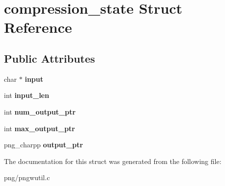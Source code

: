 \hypertarget{structcompression__state}{}\section{compression\+\_\+state Struct Reference}
\label{structcompression__state}
\subsection*{Public Attributes}
\begin{DoxyCompactItemize}
\item 
char $\ast$ {\bfseries input}\hypertarget{structcompression__state_a98d59b6660574737692d140362d80607}{}\label{structcompression__state_a98d59b6660574737692d140362d80607}

\item 
int {\bfseries input\+\_\+len}\hypertarget{structcompression__state_a6be5bdc61cc3af7978ad2a548f13bea0}{}\label{structcompression__state_a6be5bdc61cc3af7978ad2a548f13bea0}

\item 
int {\bfseries num\+\_\+output\+\_\+ptr}\hypertarget{structcompression__state_ac31fbbf713422f6f70613be213e53fae}{}\label{structcompression__state_ac31fbbf713422f6f70613be213e53fae}

\item 
int {\bfseries max\+\_\+output\+\_\+ptr}\hypertarget{structcompression__state_aac3c70539bb6a785f18d442363bc613b}{}\label{structcompression__state_aac3c70539bb6a785f18d442363bc613b}

\item 
png\+\_\+charpp {\bfseries output\+\_\+ptr}\hypertarget{structcompression__state_a3e99581f937a4138a4730494987c1b86}{}\label{structcompression__state_a3e99581f937a4138a4730494987c1b86}

\end{DoxyCompactItemize}


The documentation for this struct was generated from the following file\+:\begin{DoxyCompactItemize}
\item 
png/pngwutil.\+c\end{DoxyCompactItemize}
